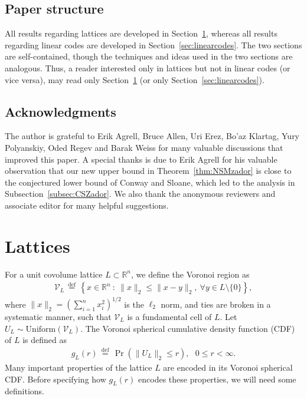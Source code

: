 \documentclass[article,doublecolumn]{IEEEtran}
\newcommand{\df}{{\, \stackrel{\mathrm{def}}{=}\, }}
\newcommand{\R}{{\mathbb{R}}}
\newcommand{\Unif}{\mathrm{Uniform}}
\newcommand{\mVL}{{\mathcal{V}_L}}
\newcommand{\VcdfL}{g_L}
\begin{document}
\subsection{Paper structure} All results regarding lattices are developed in Section~\ref{sec:lattices}, whereas all results regarding linear codes are developed in Section~\ref{sec:linearcodes}. The two sections are self-contained, though the techniques and ideas used in the two sections are analogous. Thus, a reader interested only in lattices but not in linear codes (or vice versa), may read only Section~\ref{sec:lattices} (or only Section~\ref{sec:linearcodes}).

\subsection{Acknowledgments}
The author is grateful to Erik Agrell, Bruce Allen, Uri Erez, Bo'az Klartag, Yury Polyanskiy, Oded Regev and Barak Weiss for many valuable discussions that improved this paper. A special thanks is due to Erik Agrell for his valuable observation that our new upper bound in Theorem~\ref{thm:NSMzador} is close to the conjectured lower bound of Conway and Sloane, which led to the analysis in Subsection~\ref{subsec:CSZador}.
We also thank the anonymous reviewers and associate editor for many helpful suggestions.



\section{Lattices}
\label{sec:lattices}
For a unit covolume lattice $L\subset \mathbb{R}^n$, we define the Voronoi region as
\begin{align}
\mVL\df\left\{x\in \R^n~:~\|x\|_2\leq \|x-y\|_2,~\forall y\in L\setminus\{0\} \right\},   
\end{align}
where $\|x\|_2=\left(\sum_{i=1}^n x_i^2\right)^{1/2}$ is the $\ell_2$ norm, and ties are broken in a systematic manner, such that $\mVL$ is a fundamental cell of $L$. Let $U_L\sim\Unif(\mVL)$. The Voronoi spherical cumulative density function (CDF) of $L$ is defined as
\begin{align}
\VcdfL(r)\df \Pr(\|U_L\|_2\leq r),~~~0\leq r< \infty.    
\end{align}
Many important properties of the lattice $L$ are encoded in its Voronoi spherical CDF. Before specifying how $\VcdfL(r)$ encodes these properties, we will need some definitions.
\end{document}
